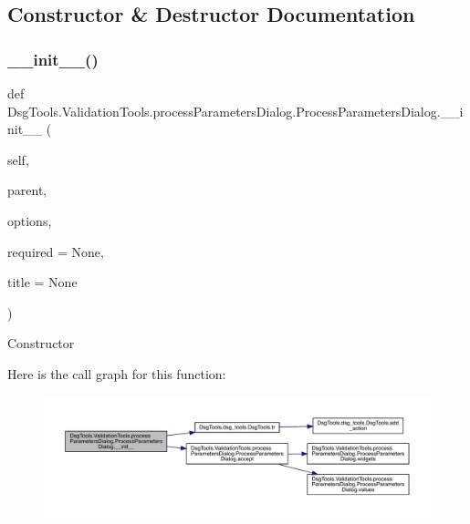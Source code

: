 \subsection{Constructor \& Destructor Documentation}
\mbox{\label{class_dsg_tools_1_1_validation_tools_1_1process_parameters_dialog_1_1_process_parameters_dialog_a94265b4a7627facd459b61ef29306383}} 
\subsubsection{\texorpdfstring{\+\_\+\+\_\+init\+\_\+\+\_\+()}{\_\_init\_\_()}}
{\footnotesize\ttfamily def Dsg\+Tools.\+Validation\+Tools.\+process\+Parameters\+Dialog.\+Process\+Parameters\+Dialog.\+\_\+\+\_\+init\+\_\+\+\_\+ (\begin{DoxyParamCaption}\item[{}]{self,  }\item[{}]{parent,  }\item[{}]{options,  }\item[{}]{required = {\ttfamily None},  }\item[{}]{title = {\ttfamily None} }\end{DoxyParamCaption})}

\begin{DoxyVerb}Constructor
\end{DoxyVerb}
 Here is the call graph for this function\+:
\nopagebreak
\begin{figure}[H]
\begin{center}
\leavevmode
\includegraphics[width=350pt]{class_dsg_tools_1_1_validation_tools_1_1process_parameters_dialog_1_1_process_parameters_dialog_a94265b4a7627facd459b61ef29306383_cgraph}
\end{center}
\end{figure}



